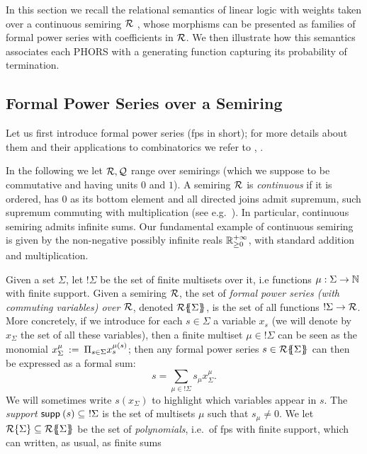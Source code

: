 In this section we recall the relational semantics of linear logic with weights taken over a continuous semiring $\mathcal{R}$ \cite{DBLP:conf/lics/LairdMMP13}, 
whose morphisms 
can be presented as families of formal power series with coefficients in $\mathcal{R}$. We then illustrate how this semantics associates each PHORS with a generating function capturing its probability of termination.



\subsection{Formal Power Series over a Semiring}
Let us first introduce formal power series (fps in short); for more details about them and their applications to combinatorics we refer to \cite{DBLP:books/daglib/0023751}, \cite{DBLP:series/tmsc/KauersP11}.

In the following we let $\mathcal{R},\mathcal{Q}$ range over semirings (which we suppose to be commutative and having units $0$ and $1$). 
A semiring $\mathcal{R}$ is \emph{continuous} if it is ordered, has $0$ as its bottom element and all directed joins admit supremum, such supremum commuting with multiplication  (see e.g.~\cite{Droste2009}). In particular, continuous semiring admits infinite sums. Our fundamental example of continuous semiring is given by the non-negative possibly infinite reals $\mathbb{R}^{+\infty}_{\geq 0}$, with standard addition and multiplication.

 Given a set $\Sigma$, 
let $!\Sigma$ be the set of finite multisets over it, i.e functions $\mu: \Sigma \to \mathbb{N}$ with finite support. Given a semiring $\mathcal{R}$, the set of \emph{formal power series (with commuting variables) over $\mathcal{R}$}, denoted ${\mathcal{R}}\{\!\!\{\Sigma\}\!\!\}$, is the set of all functions $!\Sigma \to \mathcal{R}$. More concretely, if
 we introduce for each $s \in \Sigma$ a variable $x_s$ (we will denote by $x_\Sigma$ the set of all these variables), then a finite multiset $\mu \in !\Sigma$ can be seen as the monomial $x_\Sigma^\mu \: := \: \Pi_{s \in \Sigma}x_s^{\mu(s)}$; then any formal power series $s\in {\mathcal{R}}\{\!\!\{\Sigma\}\!\!\}$ can then be expressed as a formal sum:
 $$s=\sum_{\mu \in !\Sigma} s_\mu x_\Sigma^{\mu}.$$ 
 We will sometimes write $s(x_\Sigma)$ to highlight which variables appear in $s$.
 The \emph{support} $\supp(s)\subseteq \ !\Sigma$
  is the set of multisets $\mu$ such that $s_{\mu}\neq 0$. 
 We let ${\mathcal{R}}\{\Sigma\}\subseteq {\mathcal{R}}\{\!\!\{\Sigma\}\!\!\}$ be the set of \emph{polynomials}, i.e.~of fps with finite support, which can written, as usual, as finite sums
  

